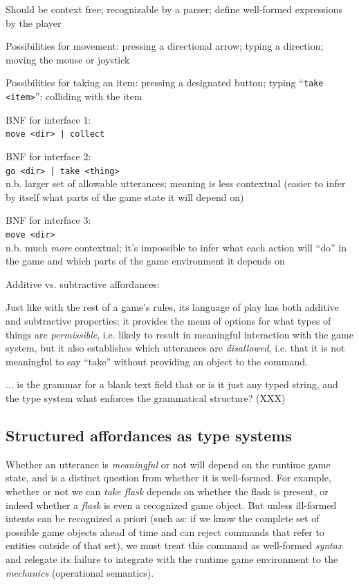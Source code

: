 \documentclass[sigconf]{acmart}
\begin{document}
  Should be context free; recognizable by a parser; define well-formed
  expressions by the player
  
  Possibilities for movement:
  pressing a directional arrow;
  typing a direction;
  moving the mouse or joystick

  Possibilities for taking an item:
  pressing a designated button;
  typing ``\verb/take <item>/'';
  colliding with the item

  BNF for interface 1:\\
  \verb/move <dir> | collect/

  BNF for interface 2:\\
  \verb/go <dir> | take <thing>/\\
  n.b. larger set of allowable utterances; meaning is less contextual
  (easier to infer by itself what parts of the game state it will depend
  on)

  BNF for interface 3:\\
  \verb/move <dir>/\\
  n.b. much {\em more} contextual; it's impossible to infer what each
  action will ``do'' in the game and which parts of the game environment it
  depends on

  Additive vs. subtractive affordances:

  Just like with the rest of a game's rules, its language of play has both
  additive and subtractive properties: it provides the menu of options for
  what types of things are {\em permissible}, i.e. likely to result in
  meaningful interaction with the game system, but it also establishes
  which utterances are {\em disallowed}, i.e. that it is not meaningful to
  say ``take'' without providing an object to the command.

  ... is the grammar for a blank text field that or is it just any typed
  string, and the type system what enforces the grammatical structure?
  (XXX)

  \subsection{Structured affordances as type systems}
  
  Whether an utterance is {\em meaningful} or not will depend on
  the runtime game state, and is a distinct question from whether it is
  well-formed. For example, whether or not we can {\em take
  flask} depends on whether the flask is present, or indeed whether a {\em
  flask} is even a recognized game object. But unless ill-formed intents can be
  recognized a priori (such as: if we know the complete set of possible
  game objects ahead of time and can reject commands that refer to entities
  outside of that set), we must treat this command as well-formed {\em
  syntax} and relegate its failure to integrate with the runtime game
  environment to the {\em mechanics} (operational semantics).
\end{document}
